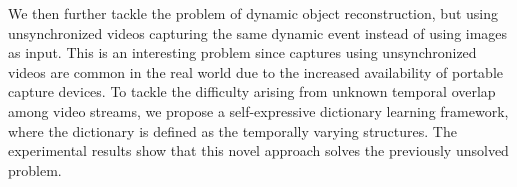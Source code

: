 We then further tackle the problem of dynamic object reconstruction, but using unsynchronized videos capturing the same dynamic event instead of using images as input. This is an interesting problem since captures using unsynchronized videos are common in the real world due to the increased availability of portable capture devices. To tackle the difficulty arising from unknown temporal overlap among video streams, we propose a self-expressive dictionary learning framework, where the dictionary is defined as the temporally varying structures. The experimental results show that this novel approach solves the previously unsolved problem.


\clearpage
